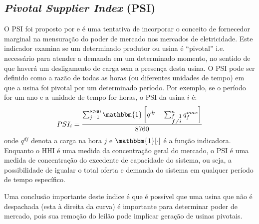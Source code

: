\subsection{\textit{Pivotal Supplier Index} (PSI)}
O PSI foi proposto por \textcite{borenstein1999market} e é uma
tentativa de incorporar o conceito de fornecedor marginal na mensuração do poder de mercado nos mercados de eletricidade. Este indicador examina se um determinado produtor ou usina é “pivotal” i.e. necessário para atender a demanda em um determinado momento, no sentido de que haverá um desligamento de carga sem a presença desta usina. O PSI pode ser definido como a razão de todas as horas (ou diferentes unidades de tempo) em que a usina foi pivotal por um determinado período. Por exemplo, se o período for um ano e a unidade de tempo for horas, o PSI da usina $i$ é:
\begin{align*}
    PSI_i = \frac{\sum_{j=1}^{8760}\mathbbm{1}\left[q^{dj}-\sum_{\substack{f=1\\f\neq i}}^nq_f^{max}\right]}{8760}
\end{align*}
onde $q^{dj}$ denota a carga na hora $j$ e $\mathbbm{1}[\cdot]$ é a função indicadora. Enquanto o HHI é uma medida da concentração geral do mercado, o PSI é uma medida de concentração do excedente de capacidade do sistema, ou seja, a possibilidade de igualar o total
oferta e demanda do sistema em qualquer período de tempo específico. 

Uma conclusão importante deste índice é que é possível que uma usina que não é despachada (esta à direita da curva) é importante para determinar poder de mercado, pois sua remoção do leilão pode implicar geração de usinas pivotais.